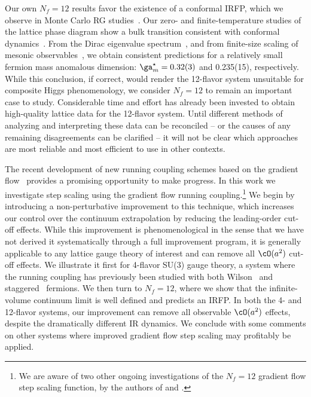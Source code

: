 Our own $N_f = 12$ results favor the existence of a conformal IRFP, which we observe in Monte Carlo RG studies~\cite{Hasenfratz:2011xn, Petropoulos:2013gaa}.
Our zero- and finite-temperature studies of the lattice phase diagram show a bulk transition consistent with conformal dynamics~\cite{Schaich:2012fr, Hasenfratz:2013uha}.
From the Dirac eigenvalue spectrum~\cite{Cheng:2013eu}, and from finite-size scaling of mesonic observables~\cite{Cheng:2013xha}, we obtain consistent predictions for a relatively small fermion mass anomalous dimension: $\ga_m^{\star} = 0.32(3)$ and 0.235(15), respectively.
While this conclusion, if correct, would render the 12-flavor system unsuitable for composite Higgs phenomenology, we consider $N_f = 12$ to remain an important case to study.
Considerable time and effort has already been invested to obtain high-quality lattice data for the 12-flavor system.
Until different methods of analyzing and interpreting these data can be reconciled -- or the causes of any remaining disagreements can be clarified -- it will not be clear which approaches are most reliable and most efficient to use in other contexts.

The recent development of new running coupling schemes based on the gradient flow~\cite{Luscher:2009eq, Luscher:2010iy, Fodor:2012td, Fodor:2012qh, Fritzsch:2013je} provides a promising opportunity to make progress.
In this work we investigate step scaling using the gradient flow running coupling.\footnote{We are aware of two other ongoing investigations of the $N_f = 12$ gradient flow step scaling function, by the authors of  and .}
We begin by introducing a non-perturbative improvement to this technique, which increases our control over the continuum extrapolation by reducing the leading-order cut-off effects.
While this improvement is phenomenological in the sense that we have not derived it systematically through a full improvement program, it is generally applicable to any lattice gauge theory of interest and can remove all $\cO(a^2)$ cut-off effects.
We illustrate it first for 4-flavor SU(3) gauge theory, a system where the running coupling has previously been studied with both Wilson~\cite{Tekin:2010mm} and staggered~\cite{PerezRubio:2010ke, Fodor:2012td, Fodor:2012qh} fermions.
We then turn to $N_f = 12$, where we show that the infinite-volume continuum limit is well defined and predicts an IRFP.
In both the 4- and 12-flavor systems, our improvement can remove all observable $\cO(a^2)$ effects, despite the dramatically different IR dynamics.
We conclude with some comments on other systems where improved gradient flow step scaling may profitably be applied.



